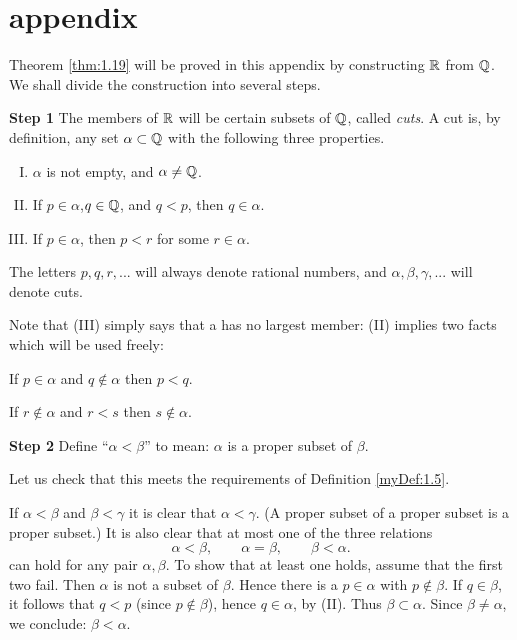 \section*{appendix}
Theorem \ref{thm:1.19} will be proved in this appendix by constructing ${\protect\mathbb R}$ from ${\protect\mathbb Q} $. 
We shall divide the construction into several steps.

\textbf{Step 1} 
The members of ${\protect\mathbb R}$ will be certain subsets of ${\protect\mathbb Q} $, called \emph{cuts}. 
A cut is, by definition, any set $\alpha \subset {\protect\mathbb Q} $ with the following three properties.
\begin{enumerate}[(I)]
    \item $\alpha$ is not empty, and $\alpha \neq {\protect\mathbb Q} $.
    \item If $p\in \alpha$,$q \in {\protect\mathbb Q} $, and $q <p$, then $q \in \alpha$.
    \item If $p \in \alpha$, then $p <r$ for some $r\in \alpha$.
\end{enumerate}


The letters $p, q, r, ...$ will always denote rational numbers, and $\alpha, \beta, \gamma, ...$
will denote cuts.


Note that (III) simply says that a has no largest member: (II) implies two facts which will be used freely:

If $p\in\alpha$ and $q\not\in\alpha$ then $p<q$.

If $r\not\in \alpha$ and $r<s$ then $s\not\in \alpha$.

\textbf{Step 2}
Define ``$\alpha < \beta$'' to mean: $\alpha$ is a proper subset of $\beta$.

Let us check that this meets the requirements of Definition \ref{myDef:1.5}.

If $\alpha < \beta$ and $\beta < \gamma$ it is clear that $\alpha < \gamma$. (A proper subset of a proper subset is a proper subset.) It is also clear that at most one of the three relations
\begin{equation*}
    \alpha < \beta, \qquad
    \alpha = \beta, \qquad
    \beta < \alpha.
\end{equation*}
can hold for any pair $\alpha, \beta$. To show that at least one holds, assume that the first two fail. Then $\alpha$ is not a subset of $\beta$. Hence there is a $p \in \alpha$ with $p \not\in \beta$. If $q \in \beta$, it follows that $q <p$ (since $p \not\in \beta$), hence $q \in \alpha$, by (II). Thus $\beta \subset \alpha$. Since $\beta \neq \alpha$, we conclude: $\beta < \alpha$.

